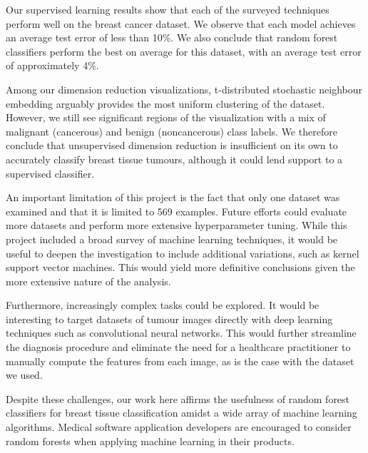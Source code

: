 \documentclass{article}
\begin{document}
Our supervised learning results show that each of the surveyed techniques perform well on the breast cancer dataset. We observe that each model achieves an average test error of less than 10\%. We also conclude that random forest classifiers perform the best on average for this dataset, with an average test error of approximately 4\%. 

Among our dimension reduction visualizations, t-distributed stochastic neighbour embedding arguably provides the most uniform clustering of the dataset. However, we still see significant regions of the visualization with a mix of malignant (cancerous) and benign (noncancerous) class labels. We therefore conclude that unsupervised dimension reduction is insufficient on its own to accurately classify breast tissue tumours, although it could lend support to a supervised classifier.

An important limitation of this project is the fact that only one dataset was examined and that it is limited to 569 examples. Future efforts could evaluate more datasets and perform more extensive hyperparameter tuning. While this project included a broad survey of machine learning techniques, it would be useful to deepen the investigation to include additional variations, such as kernel support vector machines. This would yield more definitive conclusions given the more extensive nature of the analysis.

Furthermore, increasingly complex tasks could be explored. It would be interesting to target datasets of tumour images directly with deep learning techniques such as convolutional neural networks. This would further streamline the diagnosis procedure and eliminate the need for a healthcare practitioner to manually compute the features from each image, as is the case with the dataset we used.

Despite these challenges, our work here affirms the usefulness of random forest classifiers for breast tissue classification amidst a wide array of machine learning algorithms. Medical software application developers are encouraged to consider random forests when applying machine learning  in their products.




\end{document}
